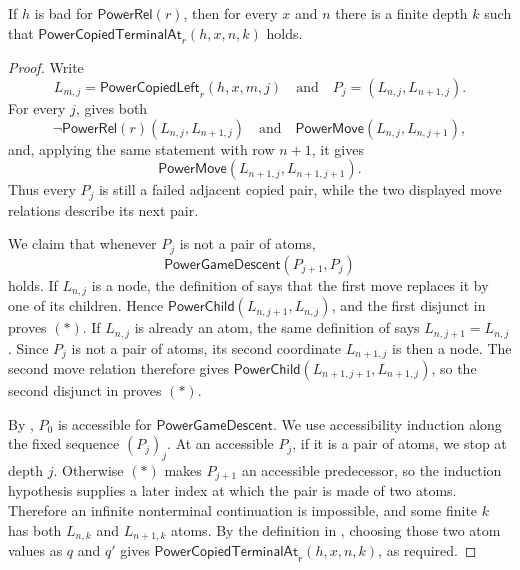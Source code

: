 \begin{lemma}
If $h$ is bad for $\mathsf{PowerRel}(r)$, then for every $x$ and $n$ there
is a finite depth $k$ such that
$\mathsf{PowerCopiedTerminalAt}_r(h,x,n,k)$ holds.
\end{lemma}
\begin{proof}
Write
\[
 L_{m,j}=\mathsf{PowerCopiedLeft}_r(h,x,m,j)
 \quad\text{and}\quad
 P_j=(L_{n,j},L_{n+1,j}).
\]
For every $j$,  gives both
\[
 \neg\mathsf{PowerRel}(r)(L_{n,j},L_{n+1,j})
 \quad\text{and}\quad
 \mathsf{PowerMove}(L_{n,j},L_{n,j+1}),
\]
and, applying the same statement with row $n+1$, it gives
\[
 \mathsf{PowerMove}(L_{n+1,j},L_{n+1,j+1}).
\]
Thus every $P_j$ is still a failed adjacent copied pair, while the two
displayed move relations describe its next pair.

We claim that whenever $P_j$ is not a pair of atoms,
\[
 \mathsf{PowerGameDescent}(P_{j+1},P_j)                       \tag{*}
\]
holds.  If $L_{n,j}$ is a node, the definition of
 says that the first move replaces it by one of its
children.  Hence
\(\mathsf{PowerChild}(L_{n,j+1},L_{n,j})\), and the first disjunct in
 proves $(*)$.  If $L_{n,j}$ is already an atom,
the same definition of  says
\(L_{n,j+1}=L_{n,j}\).  Since $P_j$ is not a pair of atoms, its second
coordinate $L_{n+1,j}$ is then a node.  The second move relation therefore
gives
\(\mathsf{PowerChild}(L_{n+1,j+1},L_{n+1,j})\), so the second disjunct in
 proves $(*)$.

By , $P_0$ is accessible for
\(\mathsf{PowerGameDescent}\).  We use accessibility induction along the
fixed sequence $(P_j)_j$.  At an accessible $P_j$, if it is a pair of
atoms, we stop at depth $j$.  Otherwise $(*)$ makes $P_{j+1}$ an accessible
predecessor, so the induction hypothesis supplies a later index at which
the pair is made of two atoms.  Therefore an infinite nonterminal
continuation is impossible, and some finite $k$ has both $L_{n,k}$ and
$L_{n+1,k}$ atoms.  By the definition in
, choosing those two atom values as $q$ and
$q'$ gives
\(\mathsf{PowerCopiedTerminalAt}_r(h,x,n,k)\), as required.
\end{proof}
